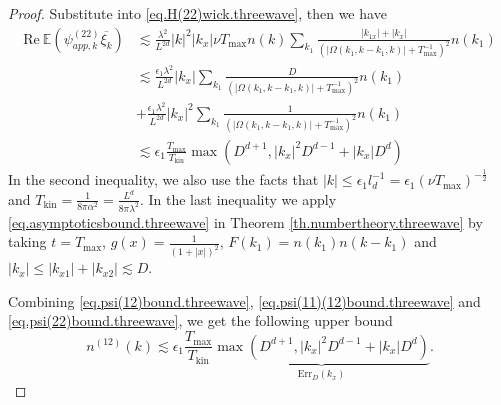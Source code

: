 \begin{proof}
Substitute into \eqref{eq.H(22)wick.threewave}, then we have
\begin{equation}\label{eq.psi(22)bound.threewave}
\begin{split}
    \text{Re}\  \mathbb E \left(\psi^{(22)}_{app,k}\overline{\xi_k}\right)&\lesssim\frac{\lambda^2}{L^{2d}} |k|^2|k_x|\nu T_{\text{max}}n(k)\sum\limits_{k_1} \frac{|k_{1x}|+|k_x|}{(|\Omega(k_1,k-k_1,k)|+T^{-1}_{\text{max}})^2}n(k_1)
    \\
    &\lesssim \frac{\epsilon_1\lambda^2}{L^{2d}}|k_x|\sum\limits_{k_1} \frac{D}{(|\Omega(k_1,k-k_1,k)|+T^{-1}_{\text{max}})^2}n(k_1)
    \\
    &+\frac{\epsilon_1\lambda^2}{L^{2d}}|k_x|^2\sum\limits_{k_1} \frac{1}{(|\Omega(k_1,k-k_1,k)|+T^{-1}_{\text{max}})^2}n(k_1)
    \\
    &\lesssim \epsilon_1\frac{T_{\text{max}}}{T_{\text{kin}}}\max(D^{d+1},|k_x|^2D^{d-1}+|k_x|D^{d})
\end{split}
\end{equation}
In the second inequality, we also use the facts that $|k|\le \epsilon_1 l_{d}^{-1}=\epsilon_1 (\nu T_{\text{max}})^{-\frac{1}{2}}$ and $T_{\text{kin}}=\frac{1}{8\pi\alpha^2}=\frac{L^{d}}{8\pi\lambda^2}$. In the last inequality we apply \eqref{eq.asymptoticsbound.threewave} in Theorem \ref{th.numbertheory.threewave} by taking $t=T_{\text{max}}$, $g(x)=\frac{1}{(1+|x|)^2}$, $F(k_1)=n(k_1) n(k-k_1)$ and $|k_x|\le |k_{x1}|+|k_{x2}|\lesssim D$. 


Combining \eqref{eq.psi(12)bound.threewave}, \eqref{eq.psi(11)(12)bound.threewave} and \eqref{eq.psi(22)bound.threewave}, we get the following upper bound
\begin{equation}\label{eq.n(12)final.threewave}
    n^{(12)}(k)\lesssim \epsilon_1\frac{T_{\text{max}}}{T_{\text{kin}}}\underbrace{\max(D^{d+1},|k_x|^2D^{d-1}+|k_x|D^{d})}_{\text{Err}_{D}(k_x)}.
\end{equation}


\end{proof}
